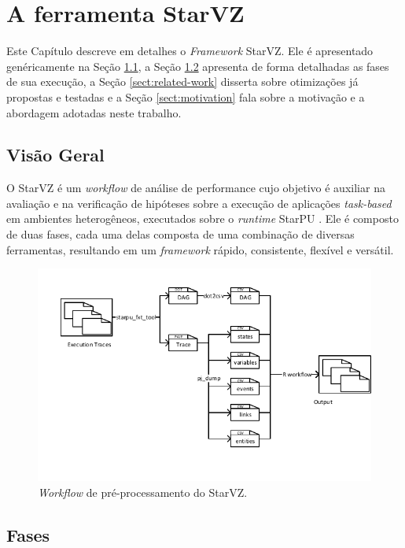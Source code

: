 \chapter{A ferramenta StarVZ} \label{ch:starvz}

Este Capítulo descreve em detalhes o \emph{Framework} StarVZ. Ele é 
apresentado genéricamente na Seção \ref{sect:starvz-overview}, a Seção 
\ref{sect:starvz-phases} apresenta de forma detalhadas as fases de sua 
execução, a Seção \ref{sect:related-work} disserta sobre otimizações já 
propostas e testadas e a Seção \ref{sect:motivation} fala sobre a motivação e a 
abordagem adotadas neste trabalho.

\section{Visão Geral}\label{sect:starvz-overview}

O StarVZ \cite{ref:starvz} é um \emph{workflow} de análise de performance cujo 
objetivo é auxiliar na avaliação e na verificação de hipóteses sobre a execução 
de aplicações \emph{task-based} em ambientes heterogêneos, executados sobre o
\emph{runtime} StarPU \cite{ref:starpu}. Ele é composto de duas fases, cada uma 
delas composta de uma combinação de diversas ferramentas, resultando em um 
\emph{framework} rápido, consistente, flexível e versátil.

\begin{figure}[ht]
 \centerline{\includegraphics[width=1\textwidth]{./img/step1-final.pdf}}
 \caption{\emph{Workflow} de pré-processamento do StarVZ.}
 \label{fig:starvz-workflow1}
\end{figure}



\section{Fases}\label{sect:starvz-phases}

